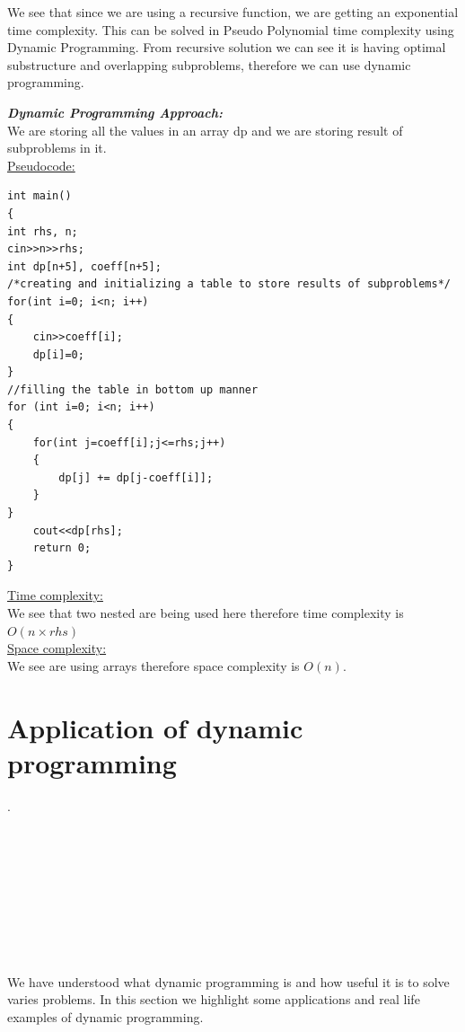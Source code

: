 \documentclass[12pt]{book}
\begin{document}
We see that since we are using a recursive function, we are getting an exponential time complexity. This can be solved in Pseudo Polynomial time complexity using Dynamic Programming. From recursive solution we can see it is having optimal substructure and overlapping subproblems, therefore we can use dynamic programming.\newline\newline

\textbf{\textit{Dynamic Programming Approach:}}\\

We are storing all the values in an array dp and we are storing result of subproblems in it.\\

\underline{Pseudocode:}\\
\begin{lstlisting}
int main()
{
int rhs, n;
cin>>n>>rhs;
int dp[n+5], coeff[n+5];
/*creating and initializing a table to store results of subproblems*/
for(int i=0; i<n; i++)
{
    cin>>coeff[i];
    dp[i]=0;
}
//filling the table in bottom up manner
for (int i=0; i<n; i++)
{
    for(int j=coeff[i];j<=rhs;j++)
    {
        dp[j] += dp[j-coeff[i]];
    }
}
    cout<<dp[rhs];
    return 0;
}
\end{lstlisting}

\underline{Time complexity:}\\
We see that two nested are being used here therefore time complexity is $O(n \times rhs)$\\

\underline{Space complexity:}\\
We see are using arrays therefore space complexity is $O(n)$.\\


\part{Application of dynamic programming}
 
 \newpage
 .\large{  \\ \\ \\ \\ \\ \\ \\ \\ \\ \\
	We have understood what dynamic programming is and how useful it is to solve varies problems. In this section we highlight some applications and real life examples of dynamic programming.\\\\ \\\\	}
 \newpage
\end{document}
